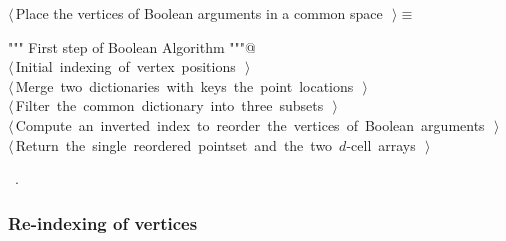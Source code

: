 \documentclass[11pt,oneside]{article}	%
\begin{document}
\begin{flushleft} \small \label{scrap3}
$\langle\,$Place the vertices of Boolean arguments in a common space\nobreak\ {\footnotesize {}}$\,\rangle\equiv$
\vspace{-1ex}
\begin{list}{}{} \item
\mbox{}\verb@""" First step of Boolean Algorithm """@\\
\mbox{}\verb@@\hbox{$\langle\,$Initial indexing of vertex positions\nobreak\ {\footnotesize {}}$\,\rangle$}\verb@@\\
\mbox{}\verb@@\hbox{$\langle\,$Merge two dictionaries with keys the point locations\nobreak\ {\footnotesize {}}$\,\rangle$}\verb@@\\
\mbox{}\verb@@\hbox{$\langle\,$Filter the common dictionary into three subsets\nobreak\ {\footnotesize {}}$\,\rangle$}\verb@@\\
\mbox{}\verb@@\hbox{$\langle\,$Compute an inverted index to reorder the vertices of Boolean arguments\nobreak\ {\footnotesize {}}$\,\rangle$}\verb@@\\
\mbox{}\verb@@\hbox{$\langle\,$Return the single reordered pointset and the two $d$-cell arrays\nobreak\ {\footnotesize {}}$\,\rangle$}\verb@@\\
\mbox{}\verb@@{\NWsep}
\end{list}
\vspace{-1ex}
\footnotesize\addtolength{\baselineskip}{-1ex}
\begin{list}{}{\setlength{\itemsep}{-\parsep}\setlength{\itemindent}{-\leftmargin}}
\item \NWtxtMacroRefIn\ .
\end{list}
\end{flushleft}

\subsubsection{Re-indexing of vertices}
\end{document}
